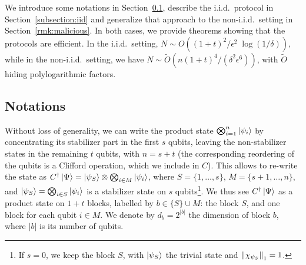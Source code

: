 \documentclass[a4paper,twocolumn,11pt,unpublished]{../../revision/quantumarticle}
\begin{document}
We introduce some notations in Section\ \ref{subsection:notations}, describe the i.i.d.\ protocol in Section\ \ref{subsection:iid} and generalize that approach to the non-i.i.d.\ setting in Section\ \ref{rmk:malicious}. In both cases, we provide theorems showing that the protocols are efficient. In the i.i.d.\ setting, $N \sim O((1+t)^2/\epsilon^2 \; \log(1/\delta))$, while in the non-i.i.d.\ setting, we have $N\sim \tilde O(n(1+t)^4/(\delta^2\epsilon^6))$, with $\tilde O$ hiding polylogarithmic factors.


\subsection{Notations}
\label{subsection:notations}
Without loss of generality, we can write the product state $\bigotimes_{i=1}^n\ket{\psi_i}$ by concentrating its stabilizer part in the first $s$ qubits, leaving the non-stabilizer states in the remaining $t$ qubits, with $n=s+t$ (the corresponding reordering of the qubits is a Clifford operation, which we include in $C$).
            This allows to re-write the state as $C^\dagger\ket\Psi=\ket{\psi_S}\otimes\bigotimes_{i\in M}\ket{\psi_i}$, where $S=\{1,\dots,s\}$, $M=\{s+1,\dots,n\}$, and $\ket{\psi_S}=\bigotimes_{i\in S}\ket{\psi_i}$ is a stabilizer state on $s$ qubits\footnote{If $s=0$, we keep the block $S$, with $\ket{\psi_S}$ the trivial state and $\left\lVert\chi_{\psi_S}\right\rVert_1=1$.}. We thus see $C^\dagger\ket\Psi$ as a product state on $1+t$ blocks, labelled by $b\in\{S\}\cup M$: the block $S$, and one block for each qubit $i\in M$. We denote by $d_b=2^{|b|}$ the dimension of block $b$, where $|b|$ is its number of qubits.
\end{document}
